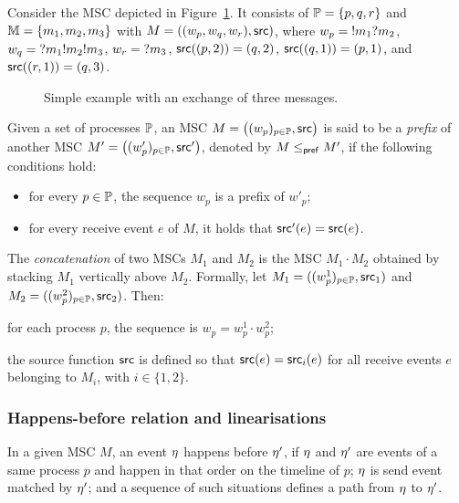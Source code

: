 \begin{example}\label{exmp:msc}
Consider the MSC depicted in Figure~\ref{fig:msc-exmp}.  
It consists of $\mathbb{P}=\{p,q,r\}$ and $\mathbb{M}=\{m_1,m_2,m_3\}$
with $M=((w_p,w_q,w_r),\mathsf{src})$, where
$w_p = {}!m_1{}?m_2$, 
$w_q = {}?m_1{}!m_2{}!m_3$, 
$w_r = {}?m_3$,
$\mathsf{src}((p,2)) = (q,2)$,
$\mathsf{src}((q,1)) = (p,1)$, and
$\mathsf{src}((r,1)) = (q,3)$.

\begin{figure}[!ht]
\centering
\begin{msc}[draw frame=none, draw head=none, msc keyword=, head height=0px, label distance=0.5ex, foot height=0px, foot distance=0px]{}

	\nextlevel
	\nextlevel
\end{msc}
\caption{Simple example with an exchange of three messages.}
\label{fig:msc-exmp}
\end{figure}
\end{example}

Given a set of processes $\mathbb{P}$, an MSC 
$M=\big((w_p)_{p\in\mathbb{P}},\mathsf{src}\big)$ is said to be a 
\emph{prefix} of another MSC 
$M'=\big((w'_p)_{p\in\mathbb{P}},\mathsf{src}'\big)$, denoted by 
$M \mathrel{\leq_{\mathsf{pref}}} M'$, if the following conditions hold:  
\begin{itemize}
    \item for every $p \in \mathbb{P}$, the sequence $w_p$ is a prefix 
    of $w'_p$;  
    \item for every receive event $e$ of $M$, it holds that 
    $\mathsf{src}'(e)=\mathsf{src}(e)$.  
\end{itemize}

The \emph{concatenation} of two MSCs $M_1$ and $M_2$ is the MSC 
$M_1 \cdot M_2$ obtained by stacking $M_1$ vertically above $M_2$. 
Formally, let 
$M_1=((w_p^1)_{p\in\mathbb{P}},\mathsf{src}_1)$ and 
$M_2=((w_p^2)_{p\in\mathbb{P}},\mathsf{src}_2)$. Then:  
\begin{inparaenum}[(i)]
   \item for each process $p$, the sequence is 
   $w_p = w_p^1 \cdot w_p^2$;  
   \item the source function $\mathsf{src}$ is defined so that 
   $\mathsf{src}(e)=\mathsf{src}_i(e)$ for all receive events $e$ belonging 
   to $M_i$, with $i\in\{1,2\}$.  
\end{inparaenum}


\subsubsection*{Happens-before relation and linearisations}
In a given MSC $M$, an event $\eta$ happens before $\eta'$, if 
$\eta$ and $\eta'$ are events
of a same process $p$ and happen in that order on 
the timeline of $p$; $\eta$ is send event matched by $\eta'$; and
a sequence of such situations defines a path from $\eta$ to $\eta'$.

